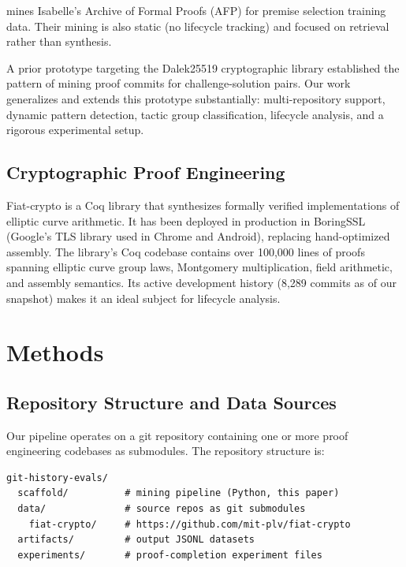 \documentclass[11pt]{article}
\begin{document}
\citet{mikula2023magnushammer} mines Isabelle's Archive of Formal Proofs (AFP) for premise selection training data. Their mining is also static (no lifecycle tracking) and focused on retrieval rather than synthesis.

A prior prototype targeting the Dalek25519 cryptographic library \citep{baif2024dalek} established the pattern of mining proof commits for challenge-solution pairs. Our work generalizes and extends this prototype substantially: multi-repository support, dynamic pattern detection, tactic group classification, lifecycle analysis, and a rigorous experimental setup.

\subsection{Cryptographic Proof Engineering}

Fiat-crypto \citep{erbsen2019simple} is a Coq library that synthesizes formally verified implementations of elliptic curve arithmetic. It has been deployed in production in BoringSSL (Google's TLS library used in Chrome and Android), replacing hand-optimized assembly. The library's Coq codebase contains over 100,000 lines of proofs spanning elliptic curve group laws, Montgomery multiplication, field arithmetic, and assembly semantics. Its active development history (8,289 commits as of our snapshot) makes it an ideal subject for lifecycle analysis.

\section{Methods}

\subsection{Repository Structure and Data Sources}

Our pipeline operates on a git repository containing one or more proof engineering codebases as submodules. The repository structure is:

\begin{verbatim}
git-history-evals/
  scaffold/          # mining pipeline (Python, this paper)
  data/              # source repos as git submodules
    fiat-crypto/     # https://github.com/mit-plv/fiat-crypto
  artifacts/         # output JSONL datasets
  experiments/       # proof-completion experiment files
\end{verbatim}
\end{document}
